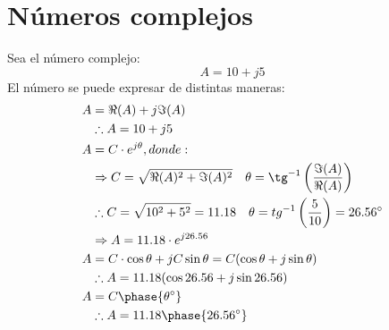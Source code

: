 \documentclass[11pt,fleqn]{book} %
\begin{document}
\section{Números complejos}
Sea el número complejo:
\begin{equation}
\label{art:numeroscomplejos}
A=10 + j5
\end{equation}
El número se puede expresar de distintas maneras:
\begin{align*}
A&=\Re(A) + j\Im(A)\\
&\therefore A=10 + j5\\
A&=C\cdot e^{j\theta}, donde:\\
&\Rightarrow C=\sqrt{\Re(A)^2 + \Im(A)^2}\hspace{10pt}\theta=\tg^{-1}\left(\frac{\Im(A)}{\Re(A)}\right)\\
&\therefore C=\sqrt{10^2+5^2}=11.18\hspace{10pt}\theta=tg^{-1}\left(\frac{5}{10}\right)=26.56^{\circ}\\
&\Rightarrow A=11.18\cdot e^{j 26.56}\\
A&=C\cdot\cos\theta+jC\sin\theta=C(\cos\theta+j\sin\theta)\\
&\therefore A=11.18(\cos 26.56+j\sin 26.56)\\
A&=C\phase{\theta^{\circ}}\\
&\therefore A=11.18\phase{26.56^{\circ}}
\end{align*}




%
%


\cleardoublepage %
\setlength{\columnsep}{0.75cm} %
\printindex %

\end{document}
